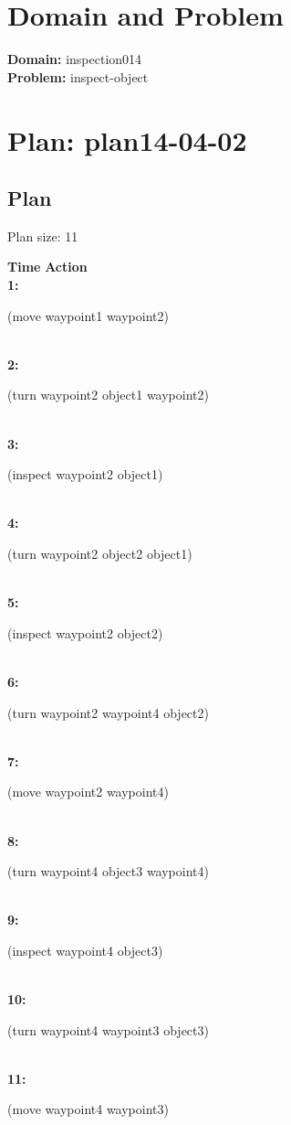 \documentclass[a4paper,12pt]{article}
\author{\mbox{\sc {\sc Val}}}
\newcommand{\headingtimeaction}{{\bf Time} \qquad \= {\bf Action}\\[0.8ex]}
\newcommand{\atime}[1]{{\bf #1:}}
\newcommand{\action}[1]{{\sf #1}}
\newcommand{\listrow}[1]{\begin{minipage}[t]{11.5cm} #1 \end{minipage}}
\begin{document}
 \maketitle 
\section{Domain and Problem}
{\bf Domain:} inspection014\\
{\bf Problem:} inspect-object
\section{\sloppy Plan: plan14-04-02}
\subsection{Plan}
Plan size: 11
\begin{tabbing}
\headingtimeaction 
\atime{1} \> \listrow{\action{(move waypoint1 waypoint2)}}\\
\atime{2} \> \listrow{\action{(turn waypoint2 object1 waypoint2)}}\\
\atime{3} \> \listrow{\action{(inspect waypoint2 object1)}}\\
\atime{4} \> \listrow{\action{(turn waypoint2 object2 object1)}}\\
\atime{5} \> \listrow{\action{(inspect waypoint2 object2)}}\\
\atime{6} \> \listrow{\action{(turn waypoint2 waypoint4 object2)}}\\
\atime{7} \> \listrow{\action{(move waypoint2 waypoint4)}}\\
\atime{8} \> \listrow{\action{(turn waypoint4 object3 waypoint4)}}\\
\atime{9} \> \listrow{\action{(inspect waypoint4 object3)}}\\
\atime{10} \> \listrow{\action{(turn waypoint4 waypoint3 object3)}}\\
\atime{11} \> \listrow{\action{(move waypoint4 waypoint3)}}\\
\end{tabbing}
\end{document}
